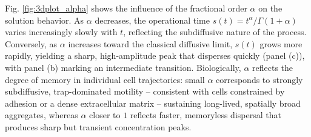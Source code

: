 \documentclass{article}
\begin{document}
\par 
Fig. \ref{fig:3dplot_alpha} shows the influence of the fractional order $\alpha$ on the solution behavior. As $\alpha$ decreases, the operational time $s(t) = t^\alpha/\Gamma(1+\alpha)$ varies increasingly slowly with $t$, reflecting the subdiffusive nature of the process. Conversely, as $\alpha$ increases toward the classical diffusive limit, $s(t)$ grows more rapidly, yielding a sharp, high-amplitude peak that disperses quickly (panel (c)), with panel (b) marking an intermediate transition. Biologically, $\alpha$ reflects the degree of memory in individual cell trajectories: small $\alpha$ corresponds to strongly subdiffusive, trap-dominated motility -- consistent with cells constrained by adhesion or a dense extracellular matrix -- sustaining long-lived, spatially broad aggregates, whereas $\alpha$ closer to $1$ reflects faster, memoryless dispersal that produces sharp but transient concentration peaks.
\end{document}
